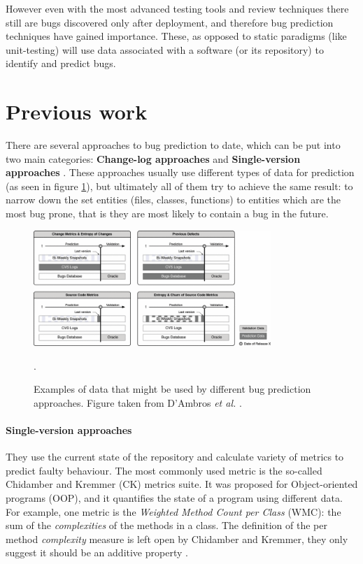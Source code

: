 \documentclass[12pt,twoside,notitlepage]{report}
\newcommand{\etal}{\textit{et al.}}
\begin{document}
However even with the most advanced testing tools and review techniques there still are bugs discovered only after deployment, and therefore bug prediction techniques have gained importance. These, as opposed to static paradigms (like unit-testing) will use data associated with a software (or its repository) to identify and predict bugs.

\section{Previous work}
There are several approaches to bug prediction to date, which can be put into two main categories: \textbf{Change-log approaches} and \textbf{Single-version approaches} \cite{5463279}. These approaches usually use different types of data for prediction (as seen in figure \ref{bug_prediction_data}), but ultimately all of them try to achieve the same result: to narrow down the set entities (files, classes, functions) to entities which are the most bug prone, that is they are most likely to contain a bug in the future.
\begin{figure}[h]
\vspace*{0.1in}
\hspace*{0.1\textwidth}
\includegraphics[width=0.8\textwidth]{bug_prediction_data.png}
\centering
\captionsetup{width=0.7\textwidth}

\caption[Examples of data that might be used by different bug prediction approaches]{Examples of data that might be used by different bug prediction approaches. Figure taken from D'Ambros \etal{} \cite{5463279}.}.
\label{bug_prediction_data}
\end{figure}

\paragraph{Single-version approaches}They use the current state of the repository and calculate variety of metrics  to predict faulty behaviour. The most commonly used metric is the so-called Chidamber and Kremmer (CK) metrics suite\cite{295895}. It was proposed for Object-oriented programs (OOP), and it quantifies the state of a program using different data. For example, one metric is the \textit{Weighted Method Count per Class} (WMC): the sum of the \textit{complexities} of the methods in a class. The definition of the per method \textit{complexity} measure is left open by Chidamber and Kremmer, they only suggest it should be an additive property \cite{295895}.
\end{document}

